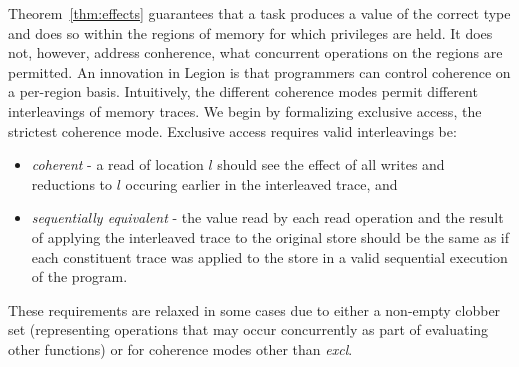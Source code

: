 Theorem~\ref{thm:effects} guarantees that a task produces a value of the
correct type and does so within the regions of memory for which privileges are held.
It does not, however, address conherence, what concurrent operations on the regions are permitted.
An innovation in Legion is that programmers can control coherence on a per-region basis.  Intuitively,
the different coherence modes permit different interleavings of memory traces.  We begin by formalizing
exclusive access, the strictest coherence mode.  Exclusive access requires valid interleavings be:
\begin{itemize}
\item {\em coherent} - a read of location $l$ should see the effect of all writes and reductions to $l$
occuring earlier in the interleaved trace, and
\item {\em sequentially equivalent} - the value read by each read 
operation and the result of applying the interleaved trace to the original store should be the same as if each constituent trace
was applied to the store in a valid sequential execution of the program.
\end{itemize}
These requirements are relaxed in some cases due to either a non-empty clobber set (representing
operations that may occur concurrently as part of evaluating other functions) or for coherence
modes other than {\em excl}.

